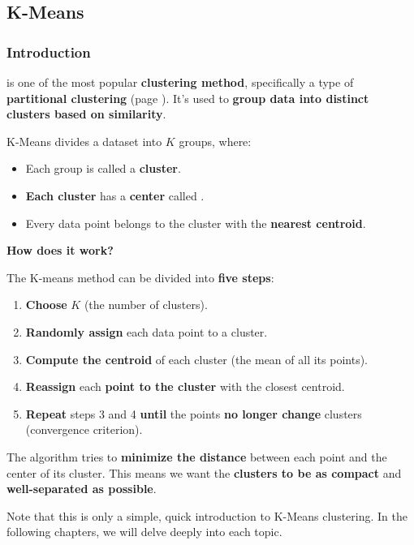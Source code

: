 \subsection{K-Means}

\subsubsection{Introduction}

 is one of the most popular \textbf{clustering method}, specifically a type of \textbf{partitional clustering} (page \pageref{def: Partitional Clustering}). It's used to \textbf{group data into distinct clusters based on similarity}.

\highspace
K-Means divides a dataset into $K$ groups, where:
\begin{itemize}
    \item Each group is called a \textbf{cluster}.
    \item \textbf{Each cluster} has a \textbf{center} called .
    \item Every data point belongs to the cluster with the \textbf{nearest centroid}.
\end{itemize}

\highspace
\begin{flushleft}
    \textcolor{Green3}{ \textbf{How does it work?}}
\end{flushleft}
The K-means method can be divided into \textbf{five steps}:
\begin{enumerate}
    \item \textbf{Choose} $K$ (the number of clusters).
    \item \textbf{Randomly assign} each data point to a cluster.
    \item \textbf{Compute the centroid} of each cluster (the mean of all its points).
    \item \textbf{Reassign} each \textbf{point to the cluster} with the closest centroid.
    \item \textbf{Repeat} steps 3 and 4 \textbf{until} the points \textbf{no longer change} clusters (convergence criterion).
\end{enumerate}
The algorithm tries to \textbf{minimize the distance} between each point and the center of its cluster. This means we want the \textbf{clusters to be as compact} and \textbf{well-separated as possible}.

\highspace
Note that this is only a simple, quick introduction to K-Means clustering. In the following chapters, we will delve deeply into each topic.